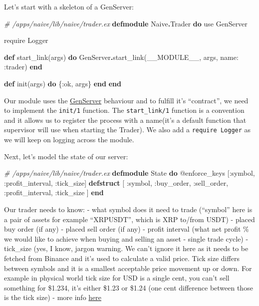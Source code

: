 \documentclass[
  oneside]{book}
\newenvironment{Shaded}{\begin{snugshade}}{\end{snugshade}}
\newcommand{\CommentTok}[1]{\textcolor[rgb]{0.56,0.35,0.01}{\textit{#1}}}
\newcommand{\ConstantTok}[1]{\textcolor[rgb]{0.00,0.00,0.00}{#1}}
\newcommand{\ImportTok}[1]{#1}
\newcommand{\KeywordTok}[1]{\textcolor[rgb]{0.13,0.29,0.53}{\textbf{#1}}}
\newcommand{\NormalTok}[1]{#1}
\newcommand{\OperatorTok}[1]{\textcolor[rgb]{0.81,0.36,0.00}{\textbf{#1}}}
\newcommand{\OtherTok}[1]{\textcolor[rgb]{0.56,0.35,0.01}{#1}}
\newcommand{\VariableTok}[1]{\textcolor[rgb]{0.00,0.00,0.00}{#1}}
\begin{document}
Let's start with a skeleton of a GenServer:

\begin{Shaded}
\begin{Highlighting}[]
\CommentTok{\# /apps/naive/lib/naive/trader.ex}
\KeywordTok{defmodule} \ConstantTok{Naive}\OperatorTok{.}\ConstantTok{Trader} \KeywordTok{do}
  \ImportTok{use} \ConstantTok{GenServer}
  
  \ImportTok{require} \ConstantTok{Logger}

  \KeywordTok{def}\NormalTok{ start\_link(args) }\KeywordTok{do}
    \ConstantTok{GenServer}\OperatorTok{.}\NormalTok{start\_link(}\ConstantTok{\_\_MODULE\_\_}\NormalTok{, args, }\VariableTok{name:} \VariableTok{:trader}\NormalTok{)}
  \KeywordTok{end}

  \KeywordTok{def}\NormalTok{ init(args) }\KeywordTok{do}
\NormalTok{    \{}\VariableTok{:ok}\NormalTok{, args\}}
  \KeywordTok{end}
\KeywordTok{end}
\end{Highlighting}
\end{Shaded}

Our module uses the \href{https://hexdocs.pm/elixir/master/GenServer.html\#content}{GenServer} behaviour and to fulfill it's ``contract'', we need to implement the \texttt{init/1} function. The \texttt{start\_link/1} function is a convention and it allows us to register the process with a name(it's a default function that supervisor will use when starting the Trader). We also add a \texttt{require\ Logger} as we will keep on logging across the module.

Next, let's model the state of our server:

\begin{Shaded}
\begin{Highlighting}[]
  \CommentTok{\# /apps/naive/lib/naive/trader.ex}
  \KeywordTok{defmodule} \ConstantTok{State} \KeywordTok{do}
    \OtherTok{@enforce\_keys}\NormalTok{ [}\VariableTok{:symbol}\NormalTok{, }\VariableTok{:profit\_interval}\NormalTok{, }\VariableTok{:tick\_size}\NormalTok{]}
    \KeywordTok{defstruct}\NormalTok{ [}
      \VariableTok{:symbol}\NormalTok{,}
      \VariableTok{:buy\_order}\NormalTok{,}
      \VariableTok{:sell\_order}\NormalTok{,}
      \VariableTok{:profit\_interval}\NormalTok{,}
      \VariableTok{:tick\_size}
\NormalTok{    ]}
  \KeywordTok{end}
\end{Highlighting}
\end{Shaded}

Our trader needs to know:
- what symbol does it need to trade (``symbol'' here is a pair of assets for example ``XRPUSDT'', which is XRP to/from USDT)
- placed buy order (if any)
- placed sell order (if any)
- profit interval (what net profit \% we would like to achieve when buying and selling an asset - single trade cycle)
- tick\_size (yes, I know, jargon warning. We can't ignore it here as it needs to be fetched from Binance and it's used to calculate a valid price. Tick size differs between symbols and it is a smallest acceptable price movement up or down. For example in physical world tick size for USD is a single cent, you can't sell something for \$1.234, it's either \$1.23 or \$1.24 (one cent difference between those is the tick size) - more info \href{https://www.investopedia.com/terms/t/tick.asp}{here}
\end{document}
